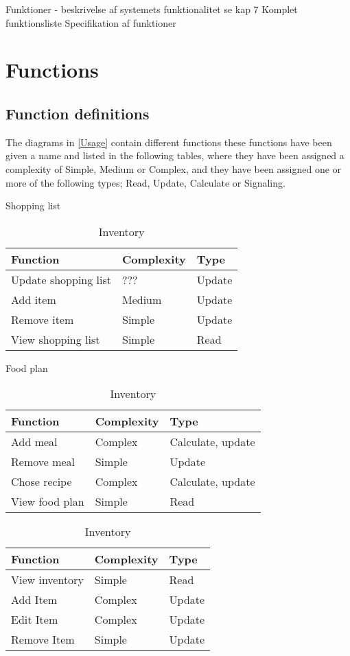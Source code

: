 Funktioner - beskrivelse af systemets funktionalitet se kap 7
	Komplet funktionsliste
	Specifikation af funktioner
	
	\chapter{Functions}
	\section{Function definitions}
	The diagrams in \ref{Usage} contain different functions these functions have been given a name and listed in the following tables, where they have been assigned a complexity of Simple, Medium or Complex, and they have been assigned one or more of the following types; Read, Update, Calculate or Signaling.
	\begin{table}[H]
	\centering
	\caption{Shopping list}
		\begin{tabular}{|l|l|l|}\hline
		\textbf{Function}&\textbf{Complexity}&\textbf{Type}\\\hline
	  Update shopping list  &  ???     & Update \\\hline
	  Add item              &  Medium  & Update \\\hline
	  Remove item           &  Simple  & Update \\\hline
	  View shopping list    &  Simple  & Read   \\\hline
	  \end{tabular}
	\linebreak
	\caption{Food plan}
	  \begin{tabular}{|l|l|l|}\hline
		\textbf{Function}&\textbf{Complexity}&\textbf{Type}\\\hline
	  Add meal              &  Complex & Calculate, update \\\hline
	  Remove meal           &  Simple  & Update            \\\hline
	  Chose recipe          &  Complex & Calculate, update \\\hline
	  View food plan        &  Simple  & Read              \\\hline
	  \end{tabular}
	\linebreak
	\caption{Inventory}
	  \begin{tabular}{|l|l|l|}\hline
		\textbf{Function}&\textbf{Complexity}&\textbf{Type}\\\hline
	  View inventory        &  Simple  & Read   \\\hline
	  Add Item              &  Complex & Update \\\hline
	  Edit Item             &  Complex & Update \\\hline
	  Remove Item           &  Simple  & Update \\\hline
\end{tabular}	  	  
	\end{table}
	